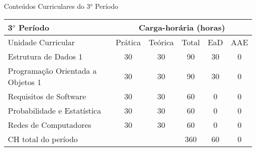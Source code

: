 \begin{quadro}[ht!]
\centering
\caption{Conteúdos Curriculares do 3$^o$ Período}\label{qua:periodo3}
\begin{tabular}{|p{8.0cm}|c|c|c|c|c|}
\hline
\rowcolor{blue1} 3$^o$ Período & \multicolumn{5}{|c|}{\centering Carga-horária (horas)} \\ \hline
\rowcolor{blue1} Unidade Curricular & Prática & Teórica & Total & EaD & AAE \\ \hline
Estrutura de Dados 1 & 30 & 30 & 90 & 30	&	0 \\	\hline
Programação Orientada a Objetos 1  & 30 & 30 & 90 & 30	&	0 \\	\hline
Requisitos de Software & 30 & 30 & 60 & 0	&	0 \\	\hline
Probabilidade e Estatística & 30 & 30 & 60 & 0	&	0 \\	\hline
Redes de Computadores & 30 & 30 & 60 & 0	&	0 \\	\hline
CH total do período & \multicolumn{2}{p{3.3cm}|}{\cellcolor{blue1}} & 360 & 60	&	0 \\ \hline
\end{tabular} \end{quadro}